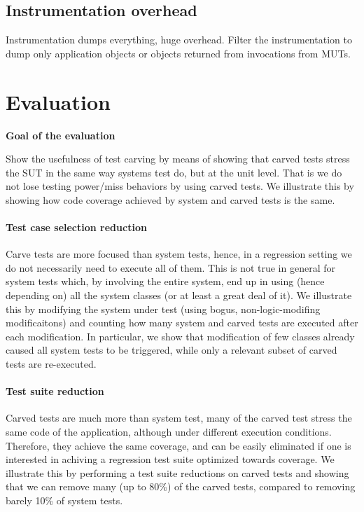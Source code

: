 \documentclass[10pt,conference]{IEEEtran}
\begin{document}
\subsection{Instrumentation overhead}
Instrumentation dumps everything, huge overhead. Filter the instrumentation to dump only application objects or objects returned from invocations from MUTs.

\section{Evaluation}

\textbf{Goal of the evaluation} 

Show the usefulness of test carving by means of showing that 
carved tests stress the SUT in the same way systems test do, but at the unit level. 
That is we do not lose testing power/miss behaviors by using carved tests.
%
We illustrate this by showing how code coverage achieved by system and carved tests is the same.

\paragraph{Test case selection reduction}
Carve tests are more focused than system tests, hence, in a regression setting we do not necessarily need 
to execute all of them. This is not true in general for system tests which, by involving the entire system, end up in using (hence depending on)
all the system classes (or at least a great deal of it).
%
We illustrate this by modifying the system under test (using bogus, non-logic-modifing modificaitons) and counting how many system and carved
tests are executed after each modification. In particular, we show that modification of few classes already caused all system tests to be triggered,
while only a relevant subset of carved tests are re-executed.

\paragraph{Test suite reduction}
Carved tests are much more than system test, many of the carved test stress the same code of the application, although under different execution conditions. Therefore, they achieve the same coverage, and can be easily eliminated if one is interested in achiving a regression test suite optimized towards coverage.
%
We illustrate this by performing a test suite reductions on carved tests and showing that we can remove many (up to 80\%) of the carved tests, compared to removing barely 10\% of system tests.
\end{document}
